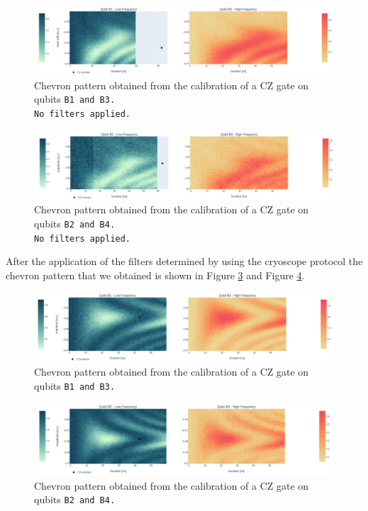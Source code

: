\begin{figure}[h!]
    \centering
    \includegraphics[width=\textwidth]{figures/png/Cryoscope/B1B3_nofilter.png}
    \caption{Chevron pattern obtained from the calibration of a CZ gate on qubits \tt{B1} and \tt{B3}.\\ No filters applied.}
    \label{fig:B1B3_nofilter}
\end{figure}

\begin{figure}[h!]
    \centering
    \includegraphics[width=\textwidth]{figures/png/Cryoscope/B2B4_nofilter.png}
    \caption{Chevron pattern obtained from the calibration of a CZ gate on qubits \tt{B2} and \tt{B4}.\\ No filters applied.}
    \label{fig:B2B4_nofilter}
\end{figure}

After the application of the filters determined by using the cryoscope protocol the chevron pattern that we obtained is shown in Figure \ref{fig:B1B3} and Figure \ref{fig:B2B4}.

\begin{figure}[h!]
    \centering
    \includegraphics[width=\textwidth]{figures/png/Cryoscope/B1B3.png}
    \caption{Chevron pattern obtained from the calibration of a CZ gate on qubits \tt{B1} and \tt{B3}.}
    \label{fig:B1B3}
\end{figure}

\begin{figure}[h!]
    \centering
    \includegraphics[width=\textwidth]{figures/png/Cryoscope/B2B4.png}
    \caption{Chevron pattern obtained from the calibration of a CZ gate on qubits \tt{B2} and \tt{B4}.}
    \label{fig:B2B4}
\end{figure}

\newpage
\restoregeometry
